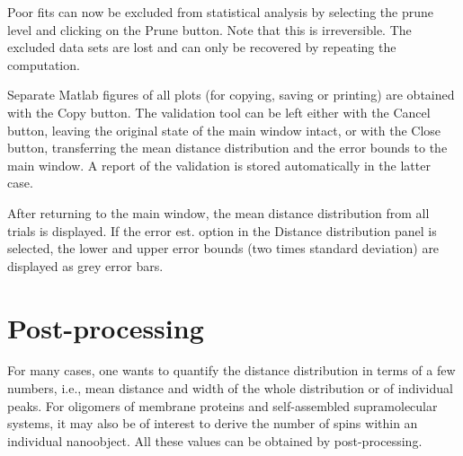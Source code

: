 \documentclass{article}
\begin{document}
Poor fits can now be excluded from statistical analysis by selecting the prune level and clicking on the {\ttfamily Prune} button. Note that this is irreversible. The excluded data sets are lost and can only be recovered by repeating the computation.

Separate Matlab figures of all plots (for copying, saving or printing) are obtained with the {\ttfamily Copy} button. The validation tool can be left either with the {\ttfamily Cancel} button, leaving the original state of the main window intact, or with the {\ttfamily Close} button, transferring the mean distance distribution and the error bounds to the main window. A report of the validation is stored automatically in the latter case.

After returning to the main window, the mean distance distribution from all trials is displayed. If the {\ttfamily error est.} option in the {\ttfamily Distance distribution} panel is selected, the lower and upper error bounds (two times standard deviation) are displayed as grey error bars.

\section{Post-processing}
\label{postprocess}
For many cases, one wants to quantify the distance distribution in terms of a few
numbers, i.e., mean distance and width of the whole distribution or of individual
peaks. For oligomers of membrane proteins and self-assembled supramolecular
systems, it may also be of interest to derive the number of spins within an
individual nanoobject. All these values can be obtained by post-processing.
\end{document}
